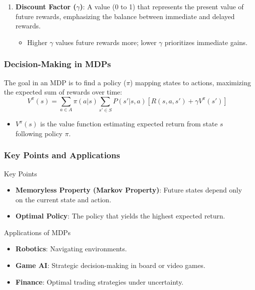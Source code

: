 \documentclass[aspectratio=169]{beamer}
\begin{document}
\begin{frame}[fragile]
\begin{enumerate}
      \item \textbf{Discount Factor ($\gamma$)}: A value (0 to 1) that represents the present value of future rewards, emphasizing the balance between immediate and delayed rewards.
          \begin{itemize}
              \item Higher $\gamma$ values future rewards more; lower $\gamma$ prioritizes immediate gains.
          \end{itemize}
  \end{enumerate}
\end{frame}

\begin{frame}[fragile]
  \frametitle{Decision-Making in MDPs}
  The goal in an MDP is to find a policy ($\pi$) mapping states to actions, maximizing the expected sum of rewards over time:
  \begin{equation}
  V^\pi(s) = \sum_{a \in A} \pi(a|s) \sum_{s' \in S} P(s'|s,a) [R(s,a,s') + \gamma V^\pi(s')]
  \end{equation}

  \begin{itemize}
      \item $V^\pi(s)$ is the value function estimating expected return from state $s$ following policy $\pi$.
  \end{itemize}
\end{frame}

\begin{frame}[fragile]
  \frametitle{Key Points and Applications}
  \begin{block}{Key Points}
      \begin{itemize}
          \item \textbf{Memoryless Property (Markov Property)}: Future states depend only on the current state and action.
          \item \textbf{Optimal Policy}: The policy that yields the highest expected return.
      \end{itemize}
  \end{block}

  \begin{block}{Applications of MDPs}
      \begin{itemize}
          \item \textbf{Robotics}: Navigating environments.
          \item \textbf{Game AI}: Strategic decision-making in board or video games.
          \item \textbf{Finance}: Optimal trading strategies under uncertainty.
      \end{itemize}
  \end{block}
\end{frame}
\end{document}
